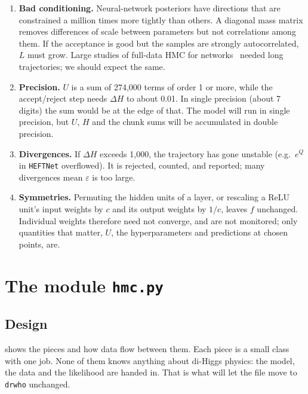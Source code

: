 \documentclass[11pt]{article}
\newcommand{\code}[1]{\texttt{#1}}
\begin{document}
\begin{watch}
\begin{enumerate}
  \item \textbf{Bad conditioning.} Neural-network posteriors have directions that are
    constrained a million times more tightly than others. A diagonal mass matrix
    removes differences of scale between parameters but not correlations among them.
    If the acceptance is good but the samples are strongly autocorrelated, $L$ must
    grow. Large studies of full-data HMC for networks~\cite{izmailov2021} needed long
    trajectories; we should expect the same.
  \item \textbf{Precision.} $U$ is a sum of 274,000 terms of order 1 or more, while the
    accept/reject step needs $\Delta H$ to about 0.01. In single precision (about 7
    digits) the sum would be at the edge of that. The model will run in single
    precision, but $U$, $H$ and the chunk sums will be accumulated in double precision.
  \item \textbf{Divergences.} If $\Delta H$ exceeds 1,000, the trajectory has gone
    unstable (e.g.\ $e^{Q}$ in \code{HEFTNet} overflowed). It is rejected, counted,
    and reported; many divergences mean $\varepsilon$ is too large.
  \item \textbf{Symmetries.} Permuting the hidden units of a layer, or rescaling a
    ReLU unit's input weights by $c$ and its output weights by $1/c$, leaves $f$
    unchanged. Individual weights therefore need not converge, and are not
    monitored; only quantities that matter, $U$, the hyperparameters and predictions
    at chosen points, are.
\end{enumerate}
\end{watch}

\section{The module \texttt{hmc.py}}
\label{sec:module}

\subsection{Design}

 shows the pieces and how data flow between them. Each piece is a
small class with one job. None of them knows anything about di-Higgs physics: the
model, the data and the likelihood are handed in. That is what will let the file move
to \code{drwho} unchanged.
\end{document}
